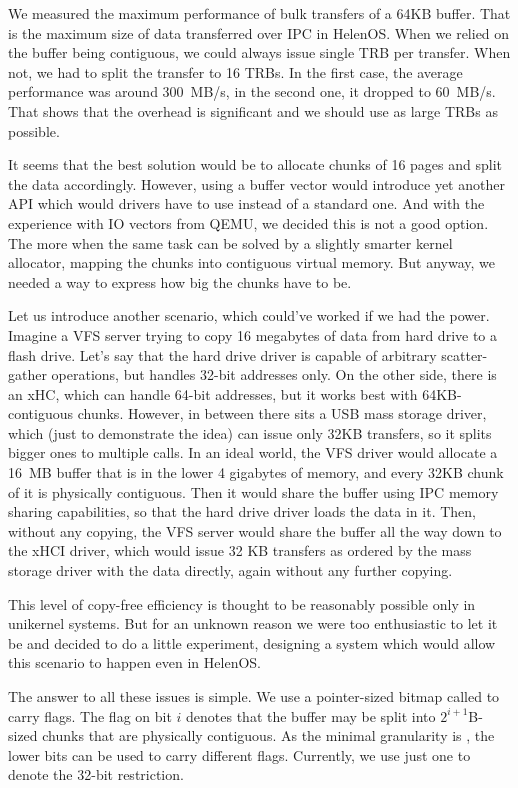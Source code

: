 We measured the maximum performance of bulk transfers of a 64KB buffer. That is
the maximum size of data transferred over IPC in HelenOS. When we relied on the
buffer being contiguous, we could always issue single TRB per transfer. When
not, we had to split the transfer to 16 TRBs. In the first case, the average
performance was around 300~MB/s, in the second one, it dropped to 60~MB/s. That
shows that the overhead is significant and we should use as large TRBs as
possible.

It seems that the best solution would be to allocate chunks of 16 pages and
split the data accordingly. However, using a buffer vector would introduce yet
another API which would drivers have to use instead of a standard one. And with
the experience with IO vectors from QEMU, we decided this is not a good option.
The more when the same task can be solved by a slightly smarter kernel
allocator, mapping the chunks into contiguous virtual memory. But anyway, we
needed a way to express how big the chunks have to be.

Let us introduce another scenario, which could've worked if we had the power.
Imagine a VFS server trying to copy 16 megabytes of data from hard drive to
a flash drive. Let's say that the hard drive driver is capable of arbitrary
scatter-gather operations, but handles 32-bit addresses only. On the other
side, there is an xHC, which can handle 64-bit addresses, but it works best
with 64KB-contiguous chunks. However, in between there sits a USB mass storage
driver, which (just to demonstrate the idea) can issue only 32KB transfers,
so it splits bigger ones to multiple calls. In an ideal world, the VFS driver
would allocate a 16~MB buffer that is in the lower 4 gigabytes of memory, and
every 32KB chunk of it is physically contiguous. Then it would share the buffer
using IPC memory sharing capabilities, so that the hard drive driver loads the
data in it. Then, without any copying, the VFS server would share the buffer
all the way down to the xHCI driver, which would issue 32 KB transfers as
ordered by the mass storage driver with the data directly, again without any
further copying.

This level of copy-free efficiency is thought to be reasonably possible only in
unikernel systems. But for an unknown reason we were too enthusiastic to let
it be and decided to do a little experiment, designing a system which would
allow this scenario to happen even in HelenOS.

The answer to all these issues is simple. We use a pointer-sized
bitmap called  to carry flags. The flag on bit $i$ denotes
that the buffer may be split into $2^{i+1}$B-sized chunks that are physically
contiguous. As the minimal granularity is , the lower bits can
be used to carry different flags. Currently, we use just one to denote the
32-bit restriction.

